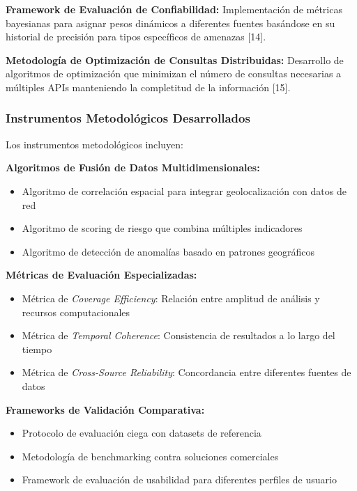 \textbf{Framework de Evaluación de Confiabilidad:} Implementación de métricas bayesianas para asignar pesos dinámicos a diferentes fuentes basándose en su historial de precisión para tipos específicos de amenazas [14].

\textbf{Metodología de Optimización de Consultas Distribuidas:} Desarrollo de algoritmos de optimización que minimizan el número de consultas necesarias a múltiples APIs manteniendo la completitud de la información [15].

\subsubsection{Instrumentos Metodológicos Desarrollados}
Los instrumentos metodológicos incluyen:

\textbf{Algoritmos de Fusión de Datos Multidimensionales:}
\begin{itemize}
    \item Algoritmo de correlación espacial para integrar geolocalización con datos de red
    \item Algoritmo de scoring de riesgo que combina múltiples indicadores
    \item Algoritmo de detección de anomalías basado en patrones geográficos
\end{itemize}

\textbf{Métricas de Evaluación Especializadas:}
\begin{itemize}
    \item Métrica de \textit{Coverage Efficiency}: Relación entre amplitud de análisis y recursos computacionales
    \item Métrica de \textit{Temporal Coherence}: Consistencia de resultados a lo largo del tiempo
    \item Métrica de \textit{Cross-Source Reliability}: Concordancia entre diferentes fuentes de datos
\end{itemize}

\textbf{Frameworks de Validación Comparativa:}
\begin{itemize}
    \item Protocolo de evaluación ciega con datasets de referencia
    \item Metodología de benchmarking contra soluciones comerciales
    \item Framework de evaluación de usabilidad para diferentes perfiles de usuario
\end{itemize}

